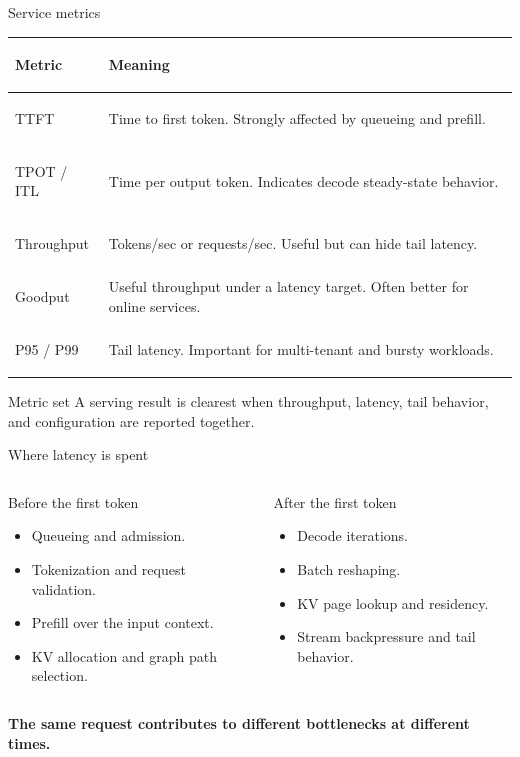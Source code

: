 \documentclass[aspectratio=169,11pt]{beamer}
\newcommand{\term}[1]{\textcolor{HUSTBlue}{\textbf{#1}}}
\begin{document}
\begin{frame}{Service metrics}
  \small
  \begin{tabularx}{\textwidth}{>{\bfseries\raggedright\arraybackslash}p{2.35cm}Y}
    \toprule
    Metric & Meaning \\
    \midrule
    TTFT & Time to first token. Strongly affected by queueing and prefill. \\
    TPOT / ITL & Time per output token. Indicates decode steady-state behavior. \\
    Throughput & Tokens/sec or requests/sec. Useful but can hide tail latency. \\
    Goodput & Useful throughput under a latency target. Often better for online services. \\
    P95 / P99 & Tail latency. Important for multi-tenant and bursty workloads. \\
    \bottomrule
  \end{tabularx}
  \vspace{0.25cm}
  \begin{block}{Metric set}
    A serving result is clearest when throughput, latency, tail behavior, and configuration are reported together.
  \end{block}
\end{frame}

\begin{frame}{Where latency is spent}
  \begin{columns}[T,totalwidth=\textwidth]
    \begin{column}{0.48\textwidth}
      \begin{block}{Before the first token}
        \begin{itemize}
          \item Queueing and admission.
          \item Tokenization and request validation.
          \item Prefill over the input context.
          \item KV allocation and graph path selection.
        \end{itemize}
      \end{block}
    \end{column}
    \begin{column}{0.48\textwidth}
      \begin{block}{After the first token}
        \begin{itemize}
          \item Decode iterations.
          \item Batch reshaping.
          \item KV page lookup and residency.
          \item Stream backpressure and tail behavior.
        \end{itemize}
      \end{block}
    \end{column}
  \end{columns}
  \vspace{0.25cm}
  \term{The same request contributes to different bottlenecks at different times.}
\end{frame}
\end{document}
